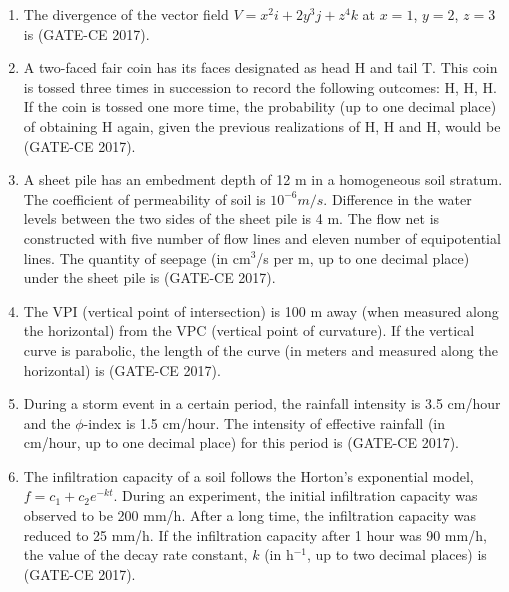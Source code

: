 \documentclass[journal,12pt,onecolumn]{article}
\theoremstyle{remark}
\begin{document}
\begin{enumerate}
    \item The divergence of the vector field $ V = x^2 i + 2 y^3 j + z^4 k $ at $ x = 1 $, $ y = 2 $, $ z = 3 $ is \underline{\hspace{3cm}} \hfill (GATE-CE 2017).

    \item A two-faced fair coin has its faces designated as head H and tail T. This coin is tossed three times in succession to record the following outcomes: H, H, H. If the coin is tossed one more time, the probability (up to one decimal place) of obtaining H again, given the previous realizations of H, H and H, would be \underline{\hspace{3cm}} \hfill (GATE-CE 2017).

    \item A sheet pile has an embedment depth of 12 m in a homogeneous soil stratum. The coefficient of permeability of soil is $10^{-6}m/s$. Difference in the water levels between the two sides of the sheet pile is 4 m. The flow net is constructed with five number of flow lines and eleven number of equipotential lines. The quantity of seepage (in cm$^3$/s per m, up to one decimal place) under the sheet pile is \underline{\hspace{3cm}} \hfill (GATE-CE 2017).

    \item The VPI (vertical point of intersection) is 100 m away (when measured along the horizontal) from the VPC (vertical point of curvature). If the vertical curve is parabolic, the length of the curve (in meters and measured along the horizontal) is \underline{\hspace{3cm}} \hfill (GATE-CE 2017).

    \item During a storm event in a certain period, the rainfall intensity is 3.5 cm/hour and the $\phi$-index is 1.5 cm/hour. The intensity of effective rainfall (in cm/hour, up to one decimal place) for this period is \underline{\hspace{3cm}} \hfill (GATE-CE 2017).

    \item The infiltration capacity of a soil follows the Horton's exponential model, $f = c_1 + c_2e^{-kt}$. During an experiment, the initial infiltration capacity was observed to be 200 mm/h. After a long time, the infiltration capacity was reduced to 25 mm/h. If the infiltration capacity after 1 hour was 90 mm/h, the value of the decay rate constant, $ k $ (in h$^{-1}$, up to two decimal places) is \underline{\hspace{3cm}} \hfill (GATE-CE 2017).


\end{enumerate}
\end{document}

